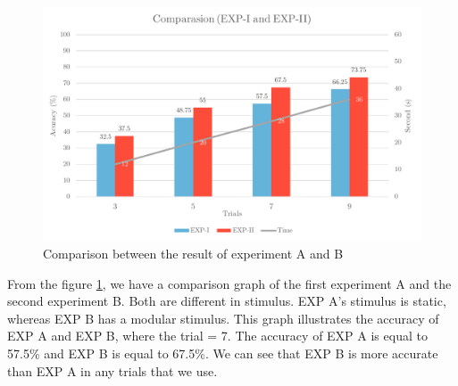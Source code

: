 \begin{figure}[ht]
	\centering
	\includegraphics[scale = 0.8]{chapter7/result1_2.pdf}
	\caption{Comparison between the result of experiment A and B}
	\label{fig:compare1}
\end{figure}

From the figure \ref{fig:compare1}, we have a comparison graph of the first experiment A and the second experiment B. Both are different in stimulus. EXP A's stimulus is static, whereas EXP B has a modular stimulus. This graph illustrates the accuracy of EXP A and EXP B, where the trial = 7. The accuracy of EXP A is equal to 57.5\% and EXP B is equal to 67.5\%. We can see that EXP B is more accurate than EXP A in any trials that we use.


